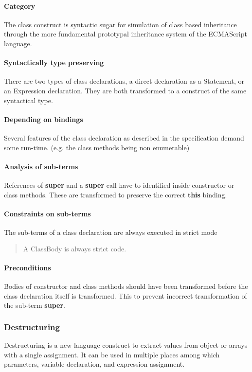 \documentclass[10pt,a4paper]{article}
\begin{document}
\paragraph{Category}
The class construct is syntactic sugar for simulation of class based inheritance through the more fundamental prototypal inheritance system of the ECMAScript language.

\paragraph{Syntactically type preserving}
There are two types of class declarations, a direct declaration as a Statement, or an Expression declaration. They are both transformed to a construct of the same syntactical type.

\paragraph{Depending on bindings}
Several features of the class declaration as described in the specification demand some run-time. (e.g. the class methods being non enumerable)

\paragraph{Analysis of sub-terms}
References of \textbf{super} and a \textbf{super} call have to identified inside constructor or class methods. These are transformed to preserve the correct \textbf{this} binding.

\paragraph{Constraints on sub-terms}
The sub-terms of a class declaration are always executed in strict mode

\blockquote[{\cite[14.5]{SpecJS}}]{A ClassBody is always strict code.}

\paragraph{Preconditions}
Bodies of constructor and class methods should have been transformed before the class declaration itself is transformed. This to prevent incorrect transformation of the sub-term \textbf{super}.

\subsubsection{Destructuring}
Destructuring\cite[12.14.5]{SpecJS} is a new language construct to extract values from object or arrays with a single assignment. It can be used in multiple places among which parameters, variable declaration, and expression assignment.
\end{document}

